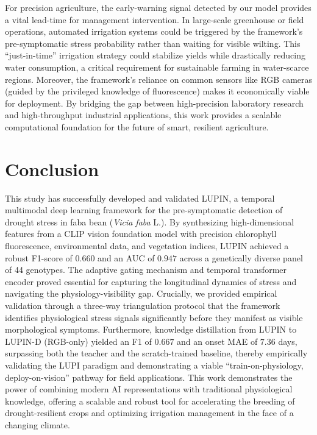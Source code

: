 \documentclass[a4paper,fleqn]{cas-dc}
\begin{document}
For precision agriculture, the early-warning signal detected by our model provides a vital lead-time for management intervention. In large-scale greenhouse or field operations, automated irrigation systems could be triggered by the framework's pre-symptomatic stress probability rather than waiting for visible wilting. This ``just-in-time'' irrigation strategy could stabilize yields while drastically reducing water consumption, a critical requirement for sustainable farming in water-scarce regions. Moreover, the framework's reliance on common sensors like RGB cameras (guided by the privileged knowledge of fluorescence) makes it economically viable for deployment. By bridging the gap between high-precision laboratory research and high-throughput industrial applications, this work provides a scalable computational foundation for the future of smart, resilient agriculture.


\section{Conclusion}\label{sec:conclusion}

This study has successfully developed and validated LUPIN, a temporal multimodal deep learning framework for the pre-symptomatic detection of drought stress in faba bean (\textit{Vicia faba} L.). By synthesizing high-dimensional features from a CLIP vision foundation model with precision chlorophyll fluorescence, environmental data, and vegetation indices, LUPIN achieved a robust F1-score of $0.660$ and an AUC of $0.947$ across a genetically diverse panel of 44 genotypes. The adaptive gating mechanism and temporal transformer encoder proved essential for capturing the longitudinal dynamics of stress and navigating the physiology-visibility gap. Crucially, we provided empirical validation through a three-way triangulation protocol that the framework identifies physiological stress signals significantly before they manifest as visible morphological symptoms. Furthermore, knowledge distillation from LUPIN to LUPIN-D (RGB-only) yielded an F1 of $0.667$ and an onset MAE of $7.36$ days, surpassing both the teacher and the scratch-trained baseline, thereby empirically validating the LUPI paradigm and demonstrating a viable ``train-on-physiology, deploy-on-vision'' pathway for field applications. This work demonstrates the power of combining modern AI representations with traditional physiological knowledge, offering a scalable and robust tool for accelerating the breeding of drought-resilient crops and optimizing irrigation management in the face of a changing climate.
\end{document}

